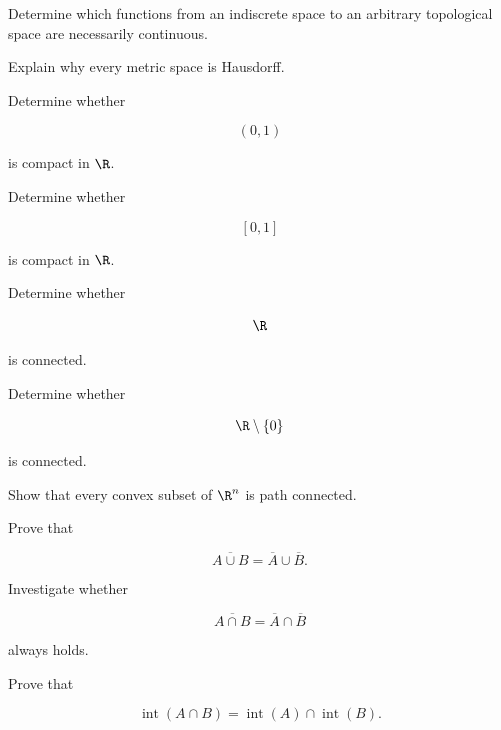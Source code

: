 \begin{exercise}[2]
Determine which functions from an indiscrete space to an arbitrary
topological space are necessarily continuous.
\end{exercise}

\begin{exercise}[2]
Explain why every metric space is Hausdorff.
\end{exercise}

\begin{exercise}[2]
Determine whether

\[
(0,1)
\]

is compact in \(\R\).
\end{exercise}

\begin{exercise}[2]
Determine whether

\[
[0,1]
\]

is compact in \(\R\).
\end{exercise}

\begin{exercise}[2]
Determine whether

\[
\R
\]

is connected.
\end{exercise}

\begin{exercise}[2]
Determine whether

\[
\R\setminus\{0\}
\]

is connected.
\end{exercise}

\begin{exercise}[2]
Show that every convex subset of \(\R^n\) is path connected.
\end{exercise}

\begin{exercise}[3]
Prove that

\[
\overline{A\cup B}
=
\overline{A}\cup\overline{B}.
\]
\end{exercise}

\begin{exercise}[3]
Investigate whether

\[
\overline{A\cap B}
=
\overline{A}\cap\overline{B}
\]

always holds.
\end{exercise}

\begin{exercise}[3]
Prove that

\[
\operatorname{int}(A\cap B)
=
\operatorname{int}(A)\cap\operatorname{int}(B).
\]
\end{exercise}

